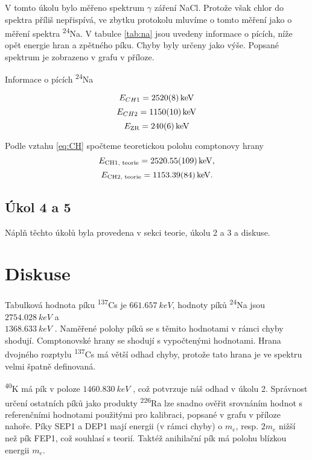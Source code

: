 \documentclass{protokol}
\begin{document}
      V tomto úkolu bylo měřeno spektrum $\gamma$ záření NaCl. Protože však chlor do spektra příliš nepřispívá, ve zbytku protokolu mluvíme o tomto měření jako o měření spektra \textsuperscript{24}Na. V tabulce \ref{tab:na} jsou uvedeny informace o pících, níže opět energie hran a zpětného píku. Chyby byly určeny jako výše. Popsané spektrum je zobrazeno v grafu v příloze.

      \begin{table}[H]
        \centering
        \setlength{\tabcolsep}{10pt}
        
        \caption{Informace o pících \textsuperscript{24}Na}
        \label{tab:na}
      \end{table}

      $$ E_{CH1} = \SI{2520 \pm 8}{keV} $$
      $$ E_{CH2} = \SI{1150 \pm 10}{keV} $$
      $$ E_\text{ZR} = \SI{240 \pm 6}{keV} $$

      Podle vztahu \eqref{eq:CH} spočteme teoretickou polohu comptonovy hrany
      $$ E_\text{CH1, teorie} = \SI{2520.55 \pm 1.09}{keV}, $$
      $$ E_\text{CH2, teorie} = \SI{1153.39 \pm 0.84}{keV}. $$

    \subsection*{Úkol 4 a 5}

      Náplň těchto úkolů byla provedena v sekci teorie, úkolu 2 a 3 a diskuse.

  \section*{Diskuse}

    Tabulková hodnota píku \textsuperscript{137}Cs je $\SI{661.657}{keV}$, hodnoty píků \textsuperscript{24}Na jsou $\SI{2754.028}{keV}$ a\\ $\SI{1368.633}{keV}$ \cite{spektra}. Naměřené polohy píků se s těmito hodnotami v rámci chyby shodují. Comptonovské hrany se shodují s vypočtenými hodnotami. Hrana dvojného rozptylu \textsuperscript{137}Cs má větší odhad chyby, protože tato hrana je ve spektru velmi špatně definovaná.
    
    \textsuperscript{40}K má pík v poloze $\SI{1460.830}{keV}$ \cite{spektra}, což potvrzuje náš odhad v úkolu 2. Správnost určení ostatních píků jako produkty \textsuperscript{226}Ra lze snadno ověřit srovnáním hodnot s referenčními hodnotami použitými pro kalibraci, popsané v grafu v příloze nahoře. Píky SEP1 a DEP1 mají energii (v rámci chyby) o $m_e$, resp. $2 m_e$ nižší než pík FEP1, což souhlasí s teorií. Taktéž anihilační pík má polohu blízkou energii $m_e$.
\end{document}
